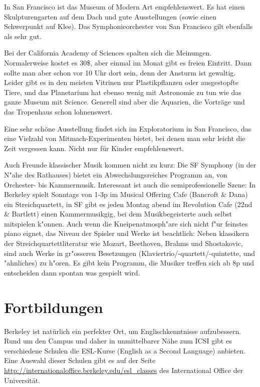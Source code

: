 \documentclass[a4paper]{scrreprt}
\begin{document}
In San Francisco ist das Museum of Modern Art empfehlenswert. Es hat einen Skulpturengarten auf dem Dach und gute Ausstellungen (sowie einen Schwerpunkt auf Klee). Das Symphonieorchester von San Francisco gilt ebenfalls als sehr gut.

Bei der California Academy of Sciences spalten sich die Meinungen. Normalerweise kostet es 30\$, aber einmal im Monat gibt es freien Eintritt. Dann sollte man aber schon vor 10 Uhr dort sein, denn der Ansturm ist gewaltig. Leider gibt es in den meisten Vitrinen nur Plastikpflanzen oder ausgestopfte Tiere, und das Planetarium hat ebenso wenig mit Astronomie zu tun wie das ganze Museum mit Science. Generell sind aber die Aquarien, die Vorträge und das Tropenhaus schon lohnenswert.

Eine sehr schöne Ausstellung findet sich im Exploratorium in San Francisco, das eine Vielzahl von Mitmach-Experimenten bietet, bei denen man sehr leicht die Zeit vergessen kann. Nicht nur für Kinder empfehlenswert.

Auch Freunde klassischer Musik kommen nicht zu kurz: Die SF Symphony (in der N"ahe des Rathauses) bietet ein Abwechslungsreiches Programm an, von Orchester- bis Kammermusik.
Interessant ist auch die semiprofessionelle Szene: In Berkeley spielt Sonntags von 1-3p im Musical Offering Cafe (Bancroft \& Dana) ein Streichquartett, in SF gibt es jeden Montag abend im Revolution Cafe (22nd \& Bartlett) einen Kammermusikgig, bei dem Musikbegeisterte auch selbst mitspielen k"onnen. Auch wenn die Kneipenatmosph"are sich nicht f"ur feinstes piano eignet, das Niveau der Spieler und Werke ist beachtlich: Neben klassikern der Streichquartettliteratur wie Mozart, Beethoven, Brahms und Shostakovic, sind auch Werke in gr"osseren Besetzungen (Klaviertrio/-quartett/-quintette, und "ahnliches) zu h"oren. Es gibt kein Programm, die Musiker treffen sich ab 8p und entscheiden dann spontan was gespielt wird.
 
\section{Fortbildungen}

Berkeley ist natürlich ein perfekter Ort, um Englischkenntnisse
aufzubessern. Rund um den Campus und daher in unmittelbarer Nähe zum
ICSI gibt es verschiedene Schulen die ESL-Kurse (English as a Second
Language) anbieten. Eine Auswahl dieser Schulen gibt es auf der Seite
\url{http://internationaloffice.berkeley.edu/esl_classes} des International
Office der Universität.  
\end{document}
